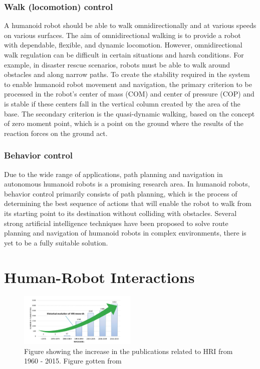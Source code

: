 \documentclass[conference]{IEEEtran}
\begin{document}
\subsubsection{Walk (locomotion) control}
A humanoid robot should be able to walk omnidirectionally and at various speeds on various surfaces. The aim of omnidirectional walking is to provide a robot with dependable, flexible, and dynamic locomotion. However, omnidirectional walk regulation can be difficult in certain situations and harsh conditions. For example, in disaster rescue scenarios, robots must be able to walk around obstacles and along narrow paths.
To create the stability required in the system to enable humanoid robot movement and navigation, the primary criterion to be processed in the robot’s center of mass (COM) and center of pressure (COP) and is stable if these centers fall in the vertical column created by the area of the base\autocite{12wang2012optimizing}. The secondary criterion is the quasi-dynamic walking, based on the concept of zero moment point, which is a point on the ground where the results of the reaction forces on the ground act.

\subsubsection{Behavior control}
Due to the wide range of applications, path planning and navigation in autonomous humanoid robots is a promising research area. In humanoid robots, behavior control primarily consists of path planning, which is the process of determining the best sequence of actions that will enable the robot to walk from its starting point to its destination without colliding with obstacles. Several strong artificial intelligence techniques have been proposed to solve route planning and navigation of humanoid robots in complex environments, there is yet to be a fully suitable solution.

\section{Human-Robot Interactions}
\begin{figure}[h]
    \centerline{\includegraphics[width=0.5\textwidth]{images/evolution_of_hri.png}}
    \caption{Figure showing the increase in the publications related to HRI from 1960 - 2015. Figure gotten from\autocite{tsarouchi2016human}}
\label{fig1}
\end{figure}
\end{document}
